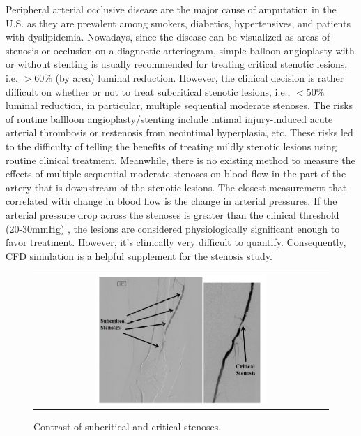 Peripheral arterial occlusive disease are the major cause of amputation in the U.S. as they are prevalent among smokers, diabetics, hypertensives, and patients with dyslipidemia. Nowadays, since the disease can be visualized as areas of stenosis or occlusion on a diagnostic arteriogram, simple balloon angioplasty with or without stenting is usually recommended for treating critical stenotic lesions, i.e. $ > 60\% $ (by area) luminal reduction. However, the clinical decision is rather difficult on whether or not to treat subcritical stenotic lesions, i.e., $ < 50\% $ luminal reduction, in particular, multiple sequential moderate stenoses. The risks of routine ballloon angioplasty/stenting include intimal injury-induced acute arterial thrombosis or restenosis\cite{holmes1984restenosis} from neointimal hyperplasia\cite{kornowski1998stent}, etc. These risks led to the difficulty of telling the benefits of treating mildly stenotic lesions using routine clinical treatment. Meanwhile, there is no existing method to measure the effects of multiple sequential moderate stenoses on blood flow in the part of the artery that is downstream of the stenotic lesions. The closest measurement that correlated with change in blood flow is the change in arterial pressures. If the arterial pressure drop across the stenoses is greater than the clinical threshold (20-30mmHg) \cite{meuwissen2002hyperemic}, the lesions are considered physiologically significant enough to favor treatment. However, it's clinically very difficult to quantify. Consequently, CFD simulation is a helpful supplement for the stenosis study.

\begin{figure}[H]
	\centering
	\begin{tabular}{c}
		\includegraphics[width=0.6\textwidth]{./pics/photo.png}
	\end{tabular}
	\caption{\footnotesize Contrast of subcritical and critical stenoses.}
\end{figure}

